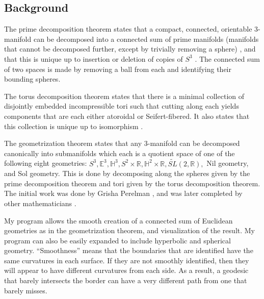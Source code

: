 \subsection{Background}

The prime decomposition theorem states that a compact, connected, orientable 3-manifold can be decomposed into a connected sum of prime manifolds (manifolds that cannot be decomposed further, except by trivially removing a sphere) \cite{Kneser}, and that this is unique up to insertion or deletion of copies of $S^3$ \cite{Milnor}. The connected sum of two spaces is made by removing a ball from each and identifying their bounding spheres.
  

The torus decomposition theorem states that there is a minimal collection of disjointly embedded incompressible tori such that cutting along each yields components that are each either atoroidal or Seifert-fibered. It also states that this collection is unique up to isomorphism \cite{JSJ3} \cite{JSJ2} \cite{JSJ1} \cite{JSJ4}.



The geometrization theorem states that any 3-manifold can be decomposed canonically into submanifolds which each is a quotient space of one of the following eight geometries: $S^3, \mathbb{E}^3, \mathbb{H}^3, S^2 \times \mathbb{R}, \mathbb{H}^2 \times \mathbb{R}, \tilde{SL}(2,\mathbb{R}),$ Nil geometry, and Sol geometry. This is done by decomposing along the spheres given by the prime decomposition theorem and tori given by the torus decomposition theorem. The initial work was done by Grisha Perelman \cite{Perelman1} \cite{Perelman3} \cite{Perelman2}, and was later completed by other mathematicians \cite{Geometrization1} \cite{Geometrization2} \cite{Geometrization3}.


My program allows the smooth creation of a connected sum of Euclidean geometries as in the geometrization theorem, and visualization of the result. My program can also be easily expanded to include hyperbolic and spherical geometry. ``Smoothness'' means that the boundaries that are identified have the same curvatures in each surface. If they are not smoothly identified, then they will appear to have different curvatures from each side. As a result, a geodesic that barely intersects the border can have a very different path from one that barely misses.

